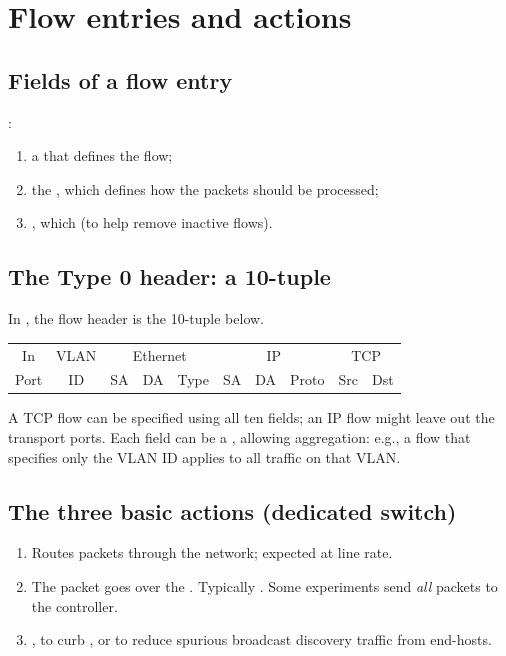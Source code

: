 \section{Flow entries and actions}
\subsection{Fields of a flow entry}
:
\begin{enumerate}
\item a  that defines the flow;
\item the , which defines how the packets should be processed;
\item {}, which  (to help remove inactive flows).
\end{enumerate}

\subsection{The Type 0 header: a 10-tuple}
In , the flow header is the 10-tuple below.
\begin{center}
\begin{tabular}{|c|c|ccc|ccc|cc|}
\hline
In & VLAN & \multicolumn{3}{c|}{Ethernet} & \multicolumn{3}{c|}{IP} & \multicolumn{2}{c|}{TCP} \\
Port & ID & SA & DA & Type & SA & DA & Proto & Src & Dst \\
\hline
\end{tabular}
\end{center}
A TCP flow can be specified using all ten fields; an IP flow might leave out the transport ports. Each field can be a , allowing aggregation: e.g., a flow that specifies only the VLAN ID applies to all traffic on that VLAN.

\subsection{The three basic actions (dedicated switch)}
\begin{enumerate}
\item {} Routes packets through the network; expected at line rate.
\item {} The packet goes over the . Typically . Some experiments send \emph{all} packets to the controller.
\item {} , to curb , or to reduce spurious broadcast discovery traffic from end-hosts.
\end{enumerate}

